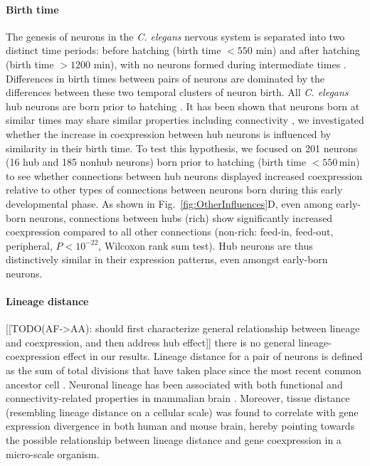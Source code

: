 \documentclass[10pt,letterpaper]{article}
\begin{document}
\paragraph{Birth time}
The genesis of neurons in the \emph{C. elegans} nervous system is separated into two distinct time periods: before hatching (birth time $<550$ min) and after hatching (birth time $>1200$ min), with no neurons formed during intermediate times \cite{Varier2011}.
Differences in birth times between pairs of neurons are dominated by the differences between these two temporal clusters of neuron birth.
All \emph{C. elegans} hub neurons are born prior to hatching \cite{Varier2011, Towlson2013}.
It has been shown that neurons born at similar times may share similar properties including connectivity \cite{Schroter:2017eo}, we investigated whether the increase in coexpression between hub neurons is influenced by similarity in their birth time.
To test this hypothesis, we focused on 201 neurons (16 hub and 185 nonhub neurons) born prior to hatching (birth time $<550$\,min) to see whether connections between hub neurons displayed increased coexpression relative to other types of connections between neurons born during this early developmental phase.
As shown in Fig.~\ref{fig:OtherInfluences}D, even among early-born neurons, connections between hubs (rich) show significantly increased coexpression compared to all other connections (non-rich: feed-in, feed-out, peripheral, $P < 10^{-22}$, Wilcoxon rank sum test).
Hub neurons are thus distinctively similar in their expression patterns, even amongst early-born neurons.


\paragraph{Lineage distance}
[[TODO(AF->AA): should first characterize general relationship between lineage and coexpression, and then address hub effect]] there is no general lineage-coexpression effect in our results.
Lineage distance for a pair of neurons is defined as the sum of total divisions that have taken place since the most recent common ancestor cell \cite{Pavlovic:2014gx, Sulston1977, Sulston1983}.
Neuronal lineage has been associated with both functional and connectivity-related properties in mammalian brain \cite{Ciceri2013,Li2012,Yu2012}.
Moreover, tissue distance (resembling lineage distance on a cellular scale) was found to correlate with gene expression divergence \cite{Cui2007} in both human and mouse brain, hereby pointing towards the possible relationship between lineage distance and gene coexpression in a micro-scale organism.
\end{document}
